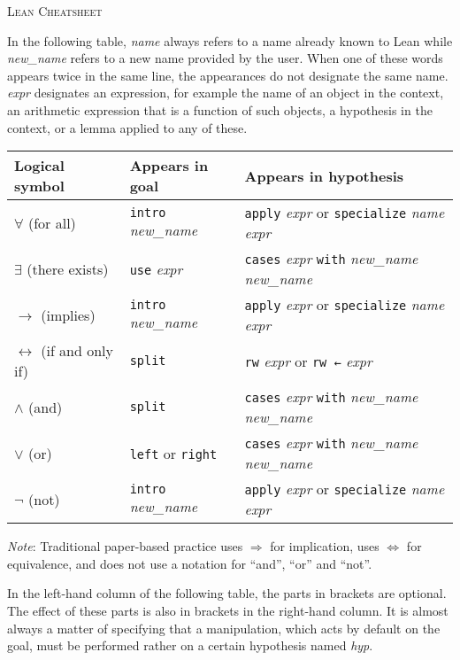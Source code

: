 \documentclass[a4paper]{article}
\newcommand{\lean}[1]{{\tt #1}}
\newcommand{\nv}{\textit{new\_name} }
\newcommand{\nom}{\textit{name} }
\newcommand{\expr}{\textit{expr} }
\newcommand{\hyp}{\textit{hyp}\xspace}
\begin{document}
\pagestyle{empty}
\begin{center}
 \large\textsc{Lean Cheatsheet}
\end{center}

In the following table,
\nom always refers to a name already known to Lean
while \nv refers to a new name provided by the user.
When one of these words appears twice in the same line,
the appearances do not designate the same name.
\expr designates an expression,
for example the name of an object in the context,
an arithmetic expression that is a function of such objects,
a hypothesis in the context,
or a lemma applied to any of these.

\begin{center}
\setlength\tabcolsep{1.6cm}
\def\arraystretch{1.5}
\begin{tabular}{@{}lll@{}}
  \toprule
  Logical symbol & Appears in goal & Appears in hypothesis \\
  \midrule
 $\forall$ (for all) & \lean{intro} \nv & \lean{apply} \expr or \lean{specialize} \nom \expr  \\
 $\exists$ (there exists) & \lean{use} \expr & \lean{cases} \expr \lean{with} \nv \nv \\
 $\to$ (implies) & \lean{intro} \nv & \lean{apply} \expr or \lean{specialize} \nom \expr \\
 $\leftrightarrow$ (if and only if) & \lean{split}  & \lean{rw} \expr or \lean{rw ←} \expr\\
 $\land$ (and) & \lean{split} & \lean{cases} \expr \lean{with} \nv \nv \\
 $\lor$ (or) & \lean{left} or \lean{right} & \lean{cases} \expr \lean{with} \nv \nv \\
 $\lnot$ (not) & \lean{intro} \nv & \lean{apply} \expr or \lean{specialize} \nom \expr  \\
  \bottomrule
\end{tabular}
\end{center}

\noindent
\emph{Note}:
Traditional paper-based practice uses $\Rightarrow$ for implication,
uses $\iff$ for equivalence,
and does not use a notation for ``and'', ``or'' and ``not''.

\medskip
\noindent
In the left-hand column of the following table,
the parts in brackets are optional.
The effect of these parts is also in brackets in the right-hand column.
It is almost always a matter of specifying that a manipulation,
which acts by default on the goal,
must be performed rather on a certain hypothesis named \hyp.
\end{document}
